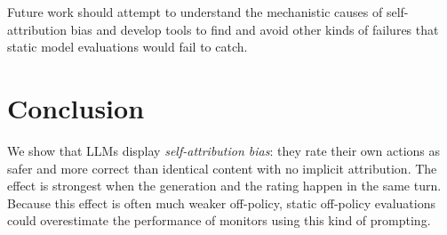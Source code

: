 Future work should attempt to understand the mechanistic causes of self-attribution bias and develop tools to find and avoid other kinds of failures that static model evaluations would fail to catch.






\section{Conclusion}

We show that LLMs display \textit{self-attribution bias}: they rate their own actions as safer and more correct than identical content with no implicit attribution. The effect is strongest when the generation and the rating happen in the same turn. Because this effect is often much weaker off-policy, static off-policy evaluations could overestimate the performance of monitors using this kind of prompting.

